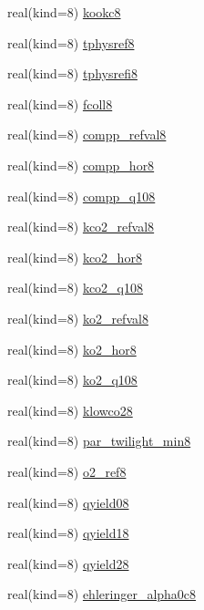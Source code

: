 \begin{DoxyCompactItemize}
\item 
real(kind=8) \hyperlink{namespacephysiology__coms_a284346103ccac25fdc1838c75b54b8e9}{kookc8}
\item 
real(kind=8) \hyperlink{namespacephysiology__coms_aa0924691938da817d9f145194aee16df}{tphysref8}
\item 
real(kind=8) \hyperlink{namespacephysiology__coms_aedf008fa411936b174aa5146e5191596}{tphysrefi8}
\item 
real(kind=8) \hyperlink{namespacephysiology__coms_a2a54f0b36ae44053e7e2d10471c8d70e}{fcoll8}
\item 
real(kind=8) \hyperlink{namespacephysiology__coms_aa9a6bcd403111bab8c6e39fa15502d08}{compp\+\_\+refval8}
\item 
real(kind=8) \hyperlink{namespacephysiology__coms_a557bf385ff4d0c1e66bbfe91c48d61a9}{compp\+\_\+hor8}
\item 
real(kind=8) \hyperlink{namespacephysiology__coms_ad3ea019b7bf4d9cc4e80e993726b56dc}{compp\+\_\+q108}
\item 
real(kind=8) \hyperlink{namespacephysiology__coms_a58bf1152a5e8f0a3a8943f94d9fdb462}{kco2\+\_\+refval8}
\item 
real(kind=8) \hyperlink{namespacephysiology__coms_a14104de29446380b41c6de1e3960e1b1}{kco2\+\_\+hor8}
\item 
real(kind=8) \hyperlink{namespacephysiology__coms_a23fd1186e97b29a505ccd16242869515}{kco2\+\_\+q108}
\item 
real(kind=8) \hyperlink{namespacephysiology__coms_ad58b3f543afd8c67c4166bf4475103de}{ko2\+\_\+refval8}
\item 
real(kind=8) \hyperlink{namespacephysiology__coms_adc6797a0fabd4a5c58f32153b03c1840}{ko2\+\_\+hor8}
\item 
real(kind=8) \hyperlink{namespacephysiology__coms_ae76b821edd73bb3355c6bbf4b22788c3}{ko2\+\_\+q108}
\item 
real(kind=8) \hyperlink{namespacephysiology__coms_a7ff06f574deb37ab9eff43f9be9da49d}{klowco28}
\item 
real(kind=8) \hyperlink{namespacephysiology__coms_aa75eca5a501c6a496939ae3d5c2eb1eb}{par\+\_\+twilight\+\_\+min8}
\item 
real(kind=8) \hyperlink{namespacephysiology__coms_a9f53be8313be66d3616cf393d3efc2de}{o2\+\_\+ref8}
\item 
real(kind=8) \hyperlink{namespacephysiology__coms_afb47d1e2c5bcf37ef401c8a6f3fd1bdf}{qyield08}
\item 
real(kind=8) \hyperlink{namespacephysiology__coms_ae8f2c4b5c0c426c0cda6a7fcfaed4fe2}{qyield18}
\item 
real(kind=8) \hyperlink{namespacephysiology__coms_ade005515e6099db96931eefbd5b36657}{qyield28}
\item 
real(kind=8) \hyperlink{namespacephysiology__coms_ac1a3c756943ad554e5a63c0f4ed23b07}{ehleringer\+\_\+alpha0c8}
\end{DoxyCompactItemize}


